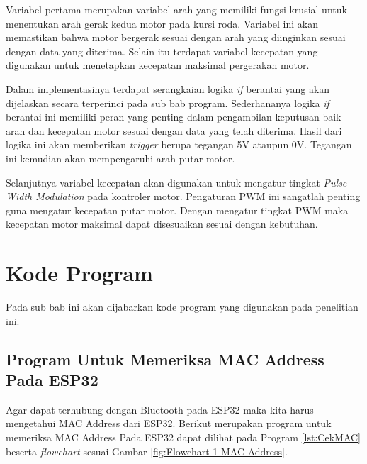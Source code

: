Variabel pertama merupakan variabel arah yang memiliki fungsi krusial untuk menentukan arah gerak kedua motor pada kursi roda. Variabel ini akan memastikan bahwa motor bergerak sesuai dengan arah yang diinginkan sesuai dengan data yang diterima. Selain itu terdapat variabel kecepatan yang digunakan untuk menetapkan kecepatan maksimal pergerakan motor.


Dalam implementasinya terdapat serangkaian logika \emph{if} berantai yang akan dijelaskan secara terperinci pada sub bab program. Sederhananya logika \emph{if} berantai ini memiliki peran yang penting dalam pengambilan keputusan baik arah dan kecepatan motor sesuai dengan data yang telah diterima. Hasil dari logika ini akan memberikan \emph{trigger} berupa tegangan 5V ataupun 0V. Tegangan ini kemudian akan mempengaruhi arah putar motor.

Selanjutnya variabel kecepatan akan digunakan untuk mengatur tingkat \emph{Pulse Width Modulation} pada kontroler motor. Pengaturan PWM ini sangatlah penting guna mengatur kecepatan putar motor. Dengan mengatur tingkat PWM maka kecepatan motor maksimal dapat disesuaikan sesuai dengan kebutuhan.


\section{Kode Program}
Pada sub bab ini akan dijabarkan kode program yang digunakan pada penelitian ini.

\subsection{Program Untuk Memeriksa MAC Address Pada ESP32}
Agar dapat terhubung dengan Bluetooth pada ESP32 maka kita harus mengetahui MAC Address dari ESP32. Berikut merupakan program untuk memeriksa MAC Address Pada ESP32 dapat dilihat pada Program \ref{lst:CekMAC} beserta \emph{flowchart} sesuai Gambar \ref{fig:Flowchart 1 MAC Address}.

